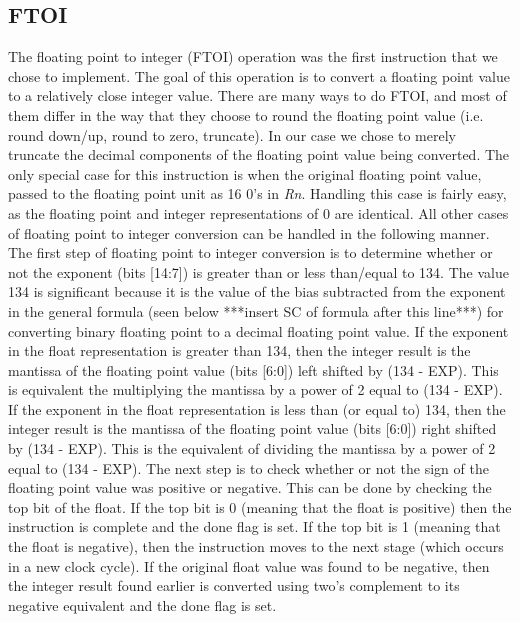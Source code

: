 \documentclass[conference]{IEEEtran}
\begin{document}
    \subsection{FTOI}
	The floating point to integer (FTOI) operation was the first instruction that we chose to implement. The goal of this operation is to convert a floating point value to a relatively close integer value. There are many ways to do FTOI, and most of them differ in the way that they choose to round the floating point value (i.e. round down/up, round to zero, truncate). In our case we chose to merely truncate the decimal components of the floating point value being converted. The only special case for this instruction is when the original floating point value, passed to the floating point unit as 16 0's in \textit{Rn}. Handling this case is fairly easy, as the floating point and integer representations of 0 are identical. All other cases of floating point to integer conversion can be handled in the following manner. The first step of floating point to integer conversion is to determine whether or not the exponent (bits [14:7]) is greater than or less than/equal to 134. The value 134 is significant because it is the value of the bias subtracted from the exponent in the general formula (seen below ***insert SC of formula after this line***) for converting binary floating point to a decimal floating point value. If the exponent in the float representation is greater than 134, then the integer result is the mantissa of the floating point value (bits [6:0]) left shifted by (134 - EXP). This is equivalent the multiplying the mantissa by a power of 2 equal to (134 - EXP). If the exponent in the float representation is less than (or equal to) 134, then the integer result is the mantissa of the floating point value (bits [6:0]) right shifted by (134 - EXP). This is the equivalent of dividing the mantissa by a power of 2 equal to (134 - EXP). The next step is to check whether or not the sign of the floating point value was positive or negative. This can be done by checking the top bit of the float. If the top bit is 0 (meaning that the float is positive) then the instruction is complete and the done flag is set. If the top bit is 1 (meaning that the float is negative), then the instruction moves to the next stage (which occurs in a new clock cycle). If the original float value was found to be negative, then the integer result found earlier is converted using two's complement to its negative equivalent and the done flag is set.
\end{document}
